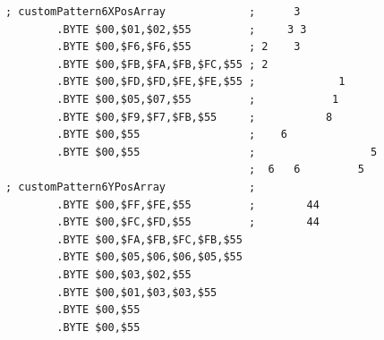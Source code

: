 \begin{lstlisting}
; customPattern6XPosArray             ;      3            
        .BYTE $00,$01,$02,$55         ;     3 3           
        .BYTE $00,$F6,$F6,$55         ; 2    3            
        .BYTE $00,$FB,$FA,$FB,$FC,$55 ; 2                 
        .BYTE $00,$FD,$FD,$FE,$FE,$55 ;             1     
        .BYTE $00,$05,$07,$55         ;            1      
        .BYTE $00,$F9,$F7,$FB,$55     ;           8       
        .BYTE $00,$55                 ;    6              
        .BYTE $00,$55                 ;                  5
                                      ;  6   6         5  
; customPattern6YPosArray             ;                   
        .BYTE $00,$FF,$FE,$55         ;        44         
        .BYTE $00,$FC,$FD,$55         ;        44         
        .BYTE $00,$FA,$FB,$FC,$FB,$55
        .BYTE $00,$05,$06,$06,$05,$55
        .BYTE $00,$03,$02,$55
        .BYTE $00,$01,$03,$03,$55
        .BYTE $00,$55
        .BYTE $00,$55
\end{lstlisting}

